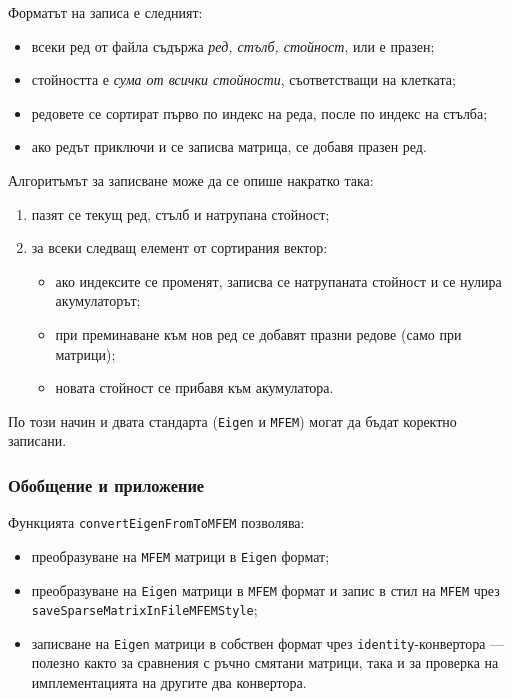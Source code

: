\documentclass{report}
\begin{document}
	Форматът на записа е следният:
	\begin{itemize}
		\item всеки ред от файла съдържа \emph{ред, стълб, стойност}, или е празен;
		\item стойността е \emph{сума от всички стойности}, съответстващи на клетката;
		\item редовете се сортират първо по индекс на реда, после по индекс на стълба;
		\item ако редът приключи и се записва матрица, се добавя празен ред.
	\end{itemize}
	
	Алгоритъмът за записване може да се опише накратко така:
	\begin{enumerate}
		\item пазят се текущ ред, стълб и натрупана стойност;
		\item за всеки следващ елемент от сортирания вектор:
		\begin{itemize}
			\item ако индексите се променят, записва се натрупаната стойност и се нулира акумулаторът;
			\item при преминаване към нов ред се добавят празни редове (само при матрици);
			\item новата стойност се прибавя към акумулатора.
		\end{itemize}
	\end{enumerate}
	По този начин и двата стандарта (\texttt{Eigen} и \texttt{MFEM}) могат да бъдат коректно записани.
	
	\subsubsection*{Обобщение и приложение}
	Функцията \texttt{convertEigenFromToMFEM} позволява:
	\begin{itemize}
		\item преобразуване на \texttt{MFEM} матрици в \texttt{Eigen} формат;
		\item преобразуване на \texttt{Eigen} матрици в \texttt{MFEM} формат и запис в стил на \texttt{MFEM} чрез\\ \texttt{saveSparseMatrixInFileMFEMStyle};
		\item записване на \texttt{Eigen} матрици в собствен формат чрез \texttt{identity}-конвертора — полезно както за сравнения с ръчно смятани матрици, така и за проверка на имплементацията на другите два конвертора.
	\end{itemize}
	
\end{document}
